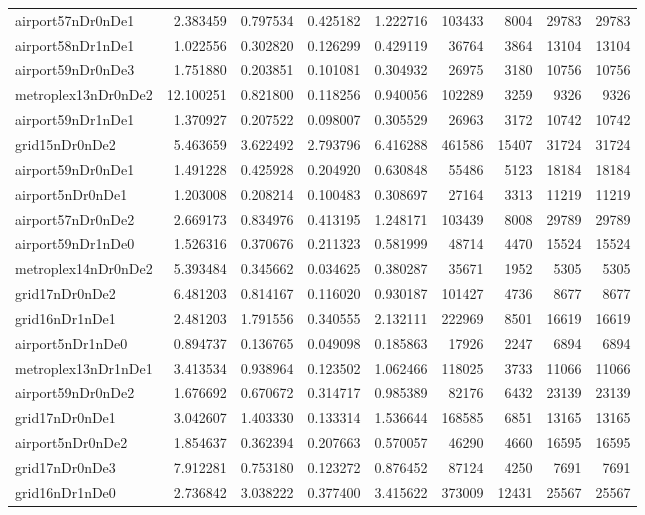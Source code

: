 \documentclass[../../../thesis.tex]{subfiles}
\begin{document}
\begin{longtable}{|l|r|r|r|r|r|r|r|r|}
airport57nDr0nDe1 & 2.383459 & 0.797534 & 0.425182 & 1.222716 & 103433 & 8004 & 29783 & 29783 \\
airport58nDr1nDe1 & 1.022556 & 0.302820 & 0.126299 & 0.429119 & 36764 & 3864 & 13104 & 13104 \\
airport59nDr0nDe3 & 1.751880 & 0.203851 & 0.101081 & 0.304932 & 26975 & 3180 & 10756 & 10756 \\
metroplex13nDr0nDe2 & 12.100251 & 0.821800 & 0.118256 & 0.940056 & 102289 & 3259 & 9326 & 9326 \\
airport59nDr1nDe1 & 1.370927 & 0.207522 & 0.098007 & 0.305529 & 26963 & 3172 & 10742 & 10742 \\
grid15nDr0nDe2 & 5.463659 & 3.622492 & 2.793796 & 6.416288 & 461586 & 15407 & 31724 & 31724 \\
airport59nDr0nDe1 & 1.491228 & 0.425928 & 0.204920 & 0.630848 & 55486 & 5123 & 18184 & 18184 \\
airport5nDr0nDe1 & 1.203008 & 0.208214 & 0.100483 & 0.308697 & 27164 & 3313 & 11219 & 11219 \\
airport57nDr0nDe2 & 2.669173 & 0.834976 & 0.413195 & 1.248171 & 103439 & 8008 & 29789 & 29789 \\
airport59nDr1nDe0 & 1.526316 & 0.370676 & 0.211323 & 0.581999 & 48714 & 4470 & 15524 & 15524 \\
metroplex14nDr0nDe2 & 5.393484 & 0.345662 & 0.034625 & 0.380287 & 35671 & 1952 & 5305 & 5305 \\
grid17nDr0nDe2 & 6.481203 & 0.814167 & 0.116020 & 0.930187 & 101427 & 4736 & 8677 & 8677 \\
grid16nDr1nDe1 & 2.481203 & 1.791556 & 0.340555 & 2.132111 & 222969 & 8501 & 16619 & 16619 \\
airport5nDr1nDe0 & 0.894737 & 0.136765 & 0.049098 & 0.185863 & 17926 & 2247 & 6894 & 6894 \\
metroplex13nDr1nDe1 & 3.413534 & 0.938964 & 0.123502 & 1.062466 & 118025 & 3733 & 11066 & 11066 \\
airport59nDr0nDe2 & 1.676692 & 0.670672 & 0.314717 & 0.985389 & 82176 & 6432 & 23139 & 23139 \\
grid17nDr0nDe1 & 3.042607 & 1.403330 & 0.133314 & 1.536644 & 168585 & 6851 & 13165 & 13165 \\
airport5nDr0nDe2 & 1.854637 & 0.362394 & 0.207663 & 0.570057 & 46290 & 4660 & 16595 & 16595 \\
grid17nDr0nDe3 & 7.912281 & 0.753180 & 0.123272 & 0.876452 & 87124 & 4250 & 7691 & 7691 \\
grid16nDr1nDe0 & 2.736842 & 3.038222 & 0.377400 & 3.415622 & 373009 & 12431 & 25567 & 25567 \\

\end{longtable}
\end{document}
